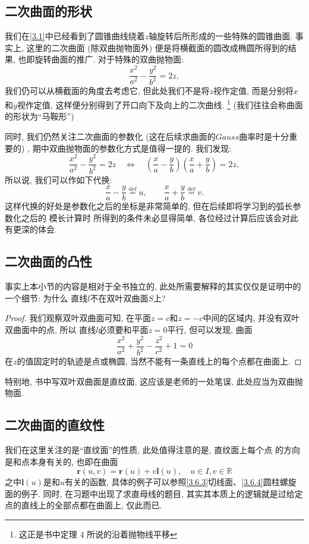 \documentclass[./main.tex]{subfiles}
\begin{document}
\subsection{二次曲面的形状}
我们在\ref{3.1}中已经看到了圆锥曲线绕着$z$轴旋转后所形成的一些特殊的圆锥曲面. 事实上, 这里的二次曲面 (除双曲抛物面外) 便是将横截面的圆改成椭圆所得到的结果, 也即旋转曲面的推广. 对于特殊的双曲抛物面: 
\[
\frac{x^2}{a^2}-\frac{y^2}{b^2}=2z,
\]
我们仍可以从横截面的角度去考虑它, 但此处我们不是将$z$视作定值, 而是分别将$x$和$y$视作定值, 这样便分别得到了开口向下及向上的二次曲线. \footnote{这正是书中定理 4 所说的沿着抛物线平移}
 (我们往往会称曲面的形状为``马鞍形'') 

同时, 我们仍然关注二次曲面的参数化 (这在后续求曲面的$Gauss$曲率时是十分重要的) , 期中双曲抛物面的参数化方式是值得一提的. 我们发现:
\[
\frac{x^2}{a^2}-\frac{y^2}{b^2}=2z\quad
\Longleftrightarrow\quad
\left(\frac{x}{a}-\frac{y}{b}\right)
\left(\frac{x}{a}+\frac{y}{b}\right)=2z,
\]
所以说, 我们可以作如下代换: 
\[
    \frac{x}{a}-\frac{y}{b}\overset{\text{def}}{=}u,
\qquad
\frac{x}{a}+\frac{y}{b}\overset{\text{def}}{=} v.
\]
这样代换的好处是参数化之后的坐标是非常简单的, 但在后续即将学习到的弧长参数化之后的
模长计算时
所得到的条件未必显得简单, 各位经过计算后应该会对此有更深的体会.
\subsection{二次曲面的凸性}
事实上本小节的内容是相对于全书独立的, 此处所需要解释的其实仅仅是证明中的一个细节: 为什么
直线$l$不在双叶双曲面$S$上?
\begin{proof}
我们观察双叶双曲面可知, 在平面$z=c$和$z=-c$中间的区域内, 并没有双叶双曲面中的点, 所以
直线$l$必须要和平面$z=0$平行, 但可以发现, 曲面
\[
\frac{x^2}{a^2}+\frac{y^2}{b^2}-\frac{z^2}{c^2}+1=0
\]
在$z$的值固定时的轨迹是点或椭圆, 当然不能有一条直线上的每个点都在曲面上. 
\end{proof}
特别地, 书中写双叶双曲面是直纹面, 这应该是老师的一处笔误, 此处应当为双曲抛物面. 
\subsection{二次曲面的直纹性}

我们在这里关注的是``直纹面''的性质, 此处值得注意的是, 直纹面上每个点
的方向是和点本身有关的, 也即在曲面
\[
\mathbf{r}(u,v)=\mathbf{r}(u)+v\mathbf{l}(u),
\quad
u\in I,v\in \mathbb{R}
\]
之中$\mathbf{l}(u)$是和$u$有关的函数, 具体的例子可以参照\ref{3.6.3}切线面、\ref{3.6.4}圆柱螺旋面的例子. 
同时, 在习题中出现了求直母线的题目, 其实其本质上的逻辑就是过给定点的直线上的全部点都在曲面上, 仅此而已. 
\end{document}
